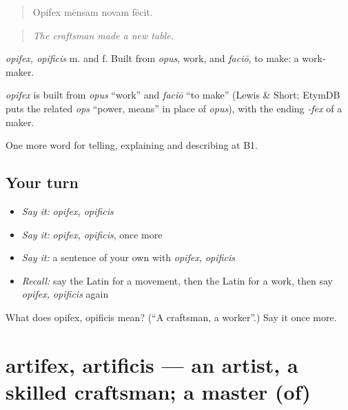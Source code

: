 \begin{quote}
Opifex mēnsam novam fēcit.
\end{quote}

\begin{quote}
\emph{The craftsman made a new table.}
\end{quote}

\emph{opifex, opificis} m. and f. Built from \emph{opus}, work, and \emph{faciō}, to make: a work-maker.

\begin{cousinweb}
\emph{opifex} is built from \emph{opus} \textquotedblleft{}work\textquotedblright{} and \emph{faciō} \textquotedblleft{}to make\textquotedblright{} (Lewis \& Short; EtymDB puts the related \emph{ops} \textquotedblleft{}power, means\textquotedblright{} in place of \emph{opus}), with the ending \emph{-fex} of a maker.
\end{cousinweb}

\begin{grammarlens}[title={What you've built}]
One more word for telling, explaining and describing at B1.
\end{grammarlens}

\subsection*{Your turn}
\begin{itemize}
\raggedright
  \item \emph{Say it:} \emph{opifex, opificis}
  \item \emph{Say it:} \emph{opifex, opificis}, once more
  \item \emph{Say it:} a sentence of your own with \emph{opifex, opificis}
  \item \emph{Recall:} say the Latin for a movement, then the Latin for a work, then say \emph{opifex, opificis} again
\end{itemize}

\begin{tcolorbox}[breakable,colback=teal!4,colframe=teal!35!black,title={Before you move on}]
What does opifex, opificis mean? (\textquotedblleft{}A craftsman, a worker\textquotedblright{}.) Say it once more.
\end{tcolorbox}
\section[artifex, artificis]{artifex, artificis — an artist, a skilled craftsman; a master (of)}

